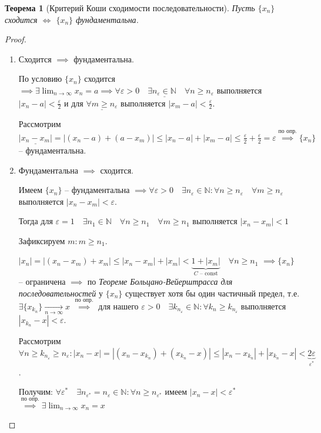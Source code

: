 \documentclass[a4paper,oneside]{article}
\newcommand{\bydef}{\stackrel{\text{по опр.}}{\implies}} %
\newcommand{\dslim}{\displaystyle\lim}
\newcommand{\dslimn}{\dslim_{n \to \infty}}
\newtheorem{theorem}{Теорема}[subsection]
\theoremstyle{definition}
\theoremstyle{definition}
\theoremstyle{definition}
\begin{document}
\begin{theorem}[Критерий Коши сходимости последовательности]
    Пусть $\{x_n\}$ сходится $\Leftrightarrow$ $\{x_n\}$ фундаментальна.    
\end{theorem}
\begin{proof}
    \begin{enumerate}
        \item 
            Сходится $\implies$ фундаментальна.
            
            По условию $\{x_n\}$ сходится $\implies \exists \dslimn x_n = a
            \implies \underline{\forall \varepsilon > 0 \quad \exists n_\varepsilon \in \mathbb{N} \quad \forall n \ge n_\varepsilon}$
            выполняется $|x_n - a| < \frac{\varepsilon}{2}$ и для $\underline{\forall m \ge n_\varepsilon}$ 
            выполняется $|x_m - a| < \frac{\varepsilon}{2}$.
        
            Рассмотрим $\underline{|x_n - x_m|} = |(x_n - a) + (a - x_m)| 
            \le |x_n - a| + |x_m - a| \le \frac{\varepsilon}{2} + \frac{\varepsilon}{2} = \varepsilon
            \bydef \{x_n\}$ -- фундаментальна.
    
        \item
            Фундаментальна $\implies$ сходится.
            
            Имеем $\{x_n\}$ -- фундаментальна 
            $\implies \forall \varepsilon > 0 \quad \exists n_\varepsilon \in \mathbb{N}:
            \forall n \ge n_\varepsilon \quad \forall m \ge n_\varepsilon$ выполняется
            $|x_n - x_m| < \varepsilon$.
        
            Тогда для $\varepsilon = 1 \quad \exists n_1 \in \mathbb{N} \quad 
            \forall n \ge n_1 \quad \forall m \ge n_1$ выполняется $|x_n - x_m| < 1$
        
            Зафиксируем $m: m \ge n_1$.
        
            $|x_n| = |(x_n - x_m) + x_m| \le |x_n - x_m| + |x_m| < 
            \underbrace{1 + |x_m|}_{C \text{ -- const}} \quad \forall n \ge n_1$
            $\implies \{x_n\}$ -- ограничена $\implies$ по 
            \textit{Теореме Больцано-Вейерштрасса для последовательностей} у $\{x_n\}$
            существует хотя бы один частичный предел, т.е. 
            $\exists \{x_{k_n}\} \underset{n \to \infty}{\to} x$
            $\bydef$ для нашего $\varepsilon > 0 \quad \exists k_{n_\varepsilon} \in \mathbb{N}:
            \forall k_n \ge k_{n_\varepsilon}$ выполняется $|x_{k_n} - x| < \varepsilon$.
        
            Рассмотрим $\forall n \ge k_{n_\varepsilon} \ge n_\varepsilon:
            |x_n - x| = |(x_n - x_{k_n}) + (x_{k_n} - x)| \le |x_n - x_{k_n}| + |x_{k_n} - x|
            < \underbrace{2 \varepsilon}_{\varepsilon^*}$.
        
            Получим:
            $\forall \varepsilon^* \quad \exists n_{\varepsilon^*} = n_\varepsilon \in \mathbb{N}:
            \forall n \ge n_{\varepsilon^*}$ имеем $|x_n - x| < \varepsilon^*$
            $\bydef \exists \dslimn x_n = x$
    \end{enumerate}
        
\end{proof}
\end{document}

